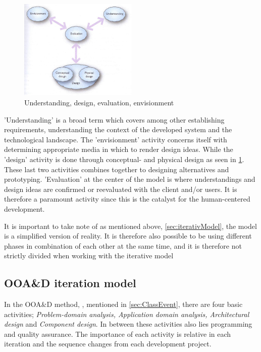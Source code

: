 \begin{figure}[H]
	\centering
	\includegraphics[width=0.5\textwidth]{billeder/DEBModel.jpg}
	\caption{Understanding, design, evaluation, envisionment \citep[p.~49]{Benyon}}\label{fig:DEBModel}
\end{figure}
'Understanding' is a broad term which covers among other establishing requirements, understanding the context of the developed system and the technological landscape.
The 'envisionment' activity concerns itself with determining appropriate media in which to render design ideas.
While the 'design' activity is done through conceptual- and physical design as seen in \cref{fig:DEBModel}.
These last two activities combines together to designing alternatives and prototyping.
'Evaluation' at the center of the model is where understandings and design ideas are confirmed or reevaluated with the client and/or users.
It is therefore a paramount activity since this is the catalyst for the human-centered development.

It is important to take note of as mentioned above, \cref{sec:iterativModel}, the model is a simplified version of reality.
It is therefore also possible to be using different phases in combination of each other at the same time, and it is therefore not strictly divided when working with the iterative model

\subsection{OOA\&D iteration model}\label{sec:Iterative3}

In the OOA\&D method, \cite{Rod-Aalborg}, mentioned in \cref{sec:ClassEvent},  there are four basic activities; \textit{Problem-domain analysis, Application domain analysis, Architectural design} and \textit{Component design}.
In between these activities  also lies programming and quality assurance.
The importance of each activity is relative in each iteration and the sequence changes from each development project.

